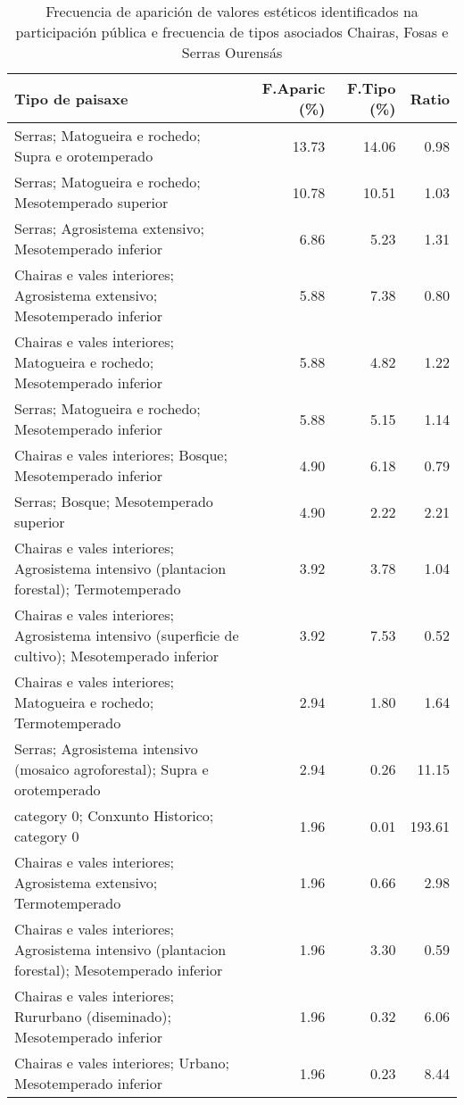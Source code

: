 \begin{table}[p]
\centering
\caption{Frecuencia de aparición de valores estéticos identificados na participación pública e frecuencia de tipos asociados Chairas, Fosas e Serras Ourensás} 
\label{vsixotest8}
\begin{tabular}{lrrr}
  \hline
Tipo de paisaxe & F.Aparic (\%) & F.Tipo (\%) & Ratio \\ 
  \hline
Serras; Matogueira e rochedo; Supra e orotemperado & 13.73 & 14.06 & 0.98 \\ 
  Serras; Matogueira e rochedo; Mesotemperado superior & 10.78 & 10.51 & 1.03 \\ 
  Serras; Agrosistema extensivo; Mesotemperado inferior & 6.86 & 5.23 & 1.31 \\ 
  Chairas e vales interiores; Agrosistema extensivo; Mesotemperado inferior & 5.88 & 7.38 & 0.80 \\ 
  Chairas e vales interiores; Matogueira e rochedo; Mesotemperado inferior & 5.88 & 4.82 & 1.22 \\ 
  Serras; Matogueira e rochedo; Mesotemperado inferior & 5.88 & 5.15 & 1.14 \\ 
  Chairas e vales interiores; Bosque; Mesotemperado inferior & 4.90 & 6.18 & 0.79 \\ 
  Serras; Bosque; Mesotemperado superior & 4.90 & 2.22 & 2.21 \\ 
  Chairas e vales interiores; Agrosistema intensivo (plantacion forestal); Termotemperado & 3.92 & 3.78 & 1.04 \\ 
  Chairas e vales interiores; Agrosistema intensivo (superficie de cultivo); Mesotemperado inferior & 3.92 & 7.53 & 0.52 \\ 
  Chairas e vales interiores; Matogueira e rochedo; Termotemperado & 2.94 & 1.80 & 1.64 \\ 
  Serras; Agrosistema intensivo (mosaico agroforestal); Supra e orotemperado & 2.94 & 0.26 & 11.15 \\ 
  category 0; Conxunto Historico; category 0 & 1.96 & 0.01 & 193.61 \\ 
  Chairas e vales interiores; Agrosistema extensivo; Termotemperado & 1.96 & 0.66 & 2.98 \\ 
  Chairas e vales interiores; Agrosistema intensivo (plantacion forestal); Mesotemperado inferior & 1.96 & 3.30 & 0.59 \\ 
  Chairas e vales interiores; Rururbano (diseminado); Mesotemperado inferior & 1.96 & 0.32 & 6.06 \\ 
  Chairas e vales interiores; Urbano; Mesotemperado inferior & 1.96 & 0.23 & 8.44 \\ 

\end{tabular}
\end{table}
